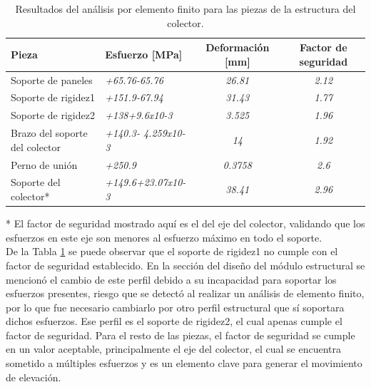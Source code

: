 \begin{table}[H]
  \centering
  \caption{Resultados del análisis por elemento finito para las piezas de la estructura del colector.}
    \begin{tabular}{|p{3.5cm}|p{2cm}|c|c|}
    \hline
    \textbf{Pieza} & \textbf{Esfuerzo [MPa]} & \multicolumn{1}{p{2.5cm}|}{\textbf{Deformación [mm]}} & \multicolumn{1}{p{2cm}|}{\textbf{Factor de seguridad}} \\
    \hline \hline
    Soporte de paneles & \textit{+65.76}\newline{}\textit{-65.76} & \textit{26.81} & \textit{2.12} \\
    \hline
    Soporte de rigidez1 & \textit{+151.9}\newline{}\textit{-67.94} & \textit{31.43} & \textit{1.77} \\
    \hline
    Soporte de rigidez2 & \textit{+138}\newline{}\textit{+9.6x10-3} & \textit{3.525} & \textit{1.96} \\
    \hline
    Brazo del soporte del colector & \textit{+140.3}\newline{}\textit{- 4.259x10-3} & \textit{14} & \textit{1.92} \\
    \hline
    Perno de unión & \textit{+250.9} & \textit{0.3758} & \textit{2.6} \\
    \hline
    Soporte del colector* & \textit{+149.6}\newline{}\textit{+23.07x10-3} & \textit{38.41} & \textit{2.96} \\
    \hline
    \end{tabular}%
  \label{tab:val_col2}%
\end{table}%

* El factor de seguridad mostrado aquí es el del eje del colector, validando que los esfuerzos en este eje son menores al esfuerzo máximo en todo el soporte.\\

De la Tabla \ref{tab:val_col2} se puede observar que el soporte de rigidez1 no cumple con el factor de seguridad establecido. En la sección del diseño del módulo estructural se mencionó el cambio de este perfil debido a su incapacidad para soportar los esfuerzos presentes, riesgo que se detectó al realizar un análisis de elemento finito, por lo que fue necesario cambiarlo por otro perfil estructural que sí soportara dichos esfuerzos. Ese perfil es el soporte de rigidez2, el cual apenas cumple el factor de seguridad. Para el resto de las piezas, el factor de seguridad se cumple en un valor aceptable, principalmente el eje del colector, el cual se encuentra sometido a múltiples esfuerzos y es un elemento clave para generar el movimiento de elevación.\\

